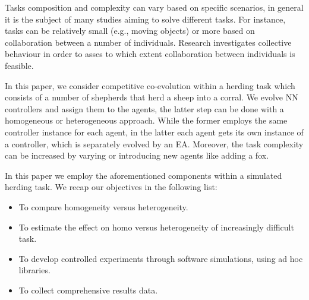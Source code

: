 \documentclass[conference]{IEEEtran}
\begin{document}
Tasks composition and complexity can vary based on specific scenarios, in general it is the subject of many studies aiming to solve different tasks.
For instance, tasks can be relatively small (e.g., moving objects) or more based on collaboration between a number of individuals.
Research investigates collective behaviour in order to asses to which extent collaboration between individuals is feasible.  

In this paper, we consider competitive co-evolution within a herding task which consists of a number of shepherds that herd a sheep into a corral.
We evolve NN controllers and assign them to the agents, the latter step can be done with a homogeneous or heterogeneous approach.
While the former employs the same controller instance for each agent,
in the latter each agent gets its own instance of a controller, which is separately evolved by an EA.
Moreover, the task complexity can be increased by varying or introducing new agents like adding a fox.

In this paper we employ the aforementioned components within a simulated herding task.
We recap our objectives in the following list:

\begin{itemize}
	\item To compare homogeneity versus heterogeneity.
	\item To estimate the effect on homo versus heterogeneity of increasingly difficult task.
 	\item To develop controlled experiments through software simulations, using ad hoc libraries.
	\item To collect comprehensive results data.
\end{itemize}
 
\end{document}
